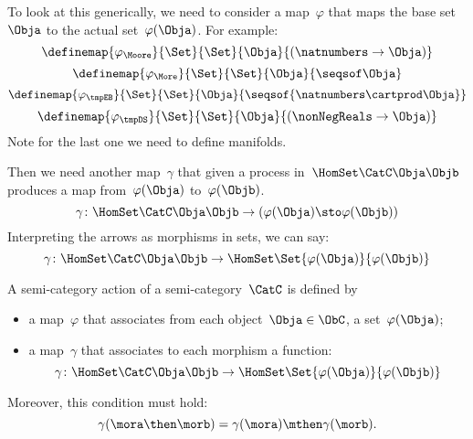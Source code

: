 To look at this generically, we need to consider a map~$\varphi$ that maps the base set~$\Obja$ to the actual set~$\varphi(\Obja)$. For example:
\begin{equation}
  \definemap{\varphi_{\Moore}}{\Set}{\Set}{\Obja}{(\natnumbers \to \Obja)}
\end{equation}
\begin{equation}
\definemap{\varphi_{\More}}{\Set}{\Set}{\Obja}{\seqsof \Obja}
\end{equation}
\begin{equation}
\definemap{\varphi_{\tmpEB}}{\Set}{\Set}{\Obja}{\seqsof{\natnumbers \cartprod \Obja}}
\end{equation}
\begin{equation}
\definemap{\varphi_{\tmpDS}}{\Set}{\Set}{\Obja}{(\nonNegReals \to \Obja)}
\end{equation}
Note for the last one we need to define manifolds.

Then we need another map~$\gamma$ that given a process in~$\HomSet\CatC\Obja\Objb$
produces a map from~$\varphi(\Obja)$ to~$\varphi(\Objb)$.
% 
\begin{equation}
  \gamma\colon \HomSet\CatC\Obja\Objb \to  (\varphi(\Obja) \sto \varphi(\Objb))
\end{equation}
% 
Interpreting the arrows as morphisms in sets, we can say:
\begin{equation}
  \gamma\colon \HomSet\CatC\Obja\Objb \to  \HomSet\Set{\varphi(\Obja)}{\varphi(\Objb) }
\end{equation}

\begin{ctdefinition}
  A semi-category action of a semi-category~$\CatC$ is defined by
  \begin{itemize}
    \item a map~$\varphi$ that associates from each object~$\Obja \in \ObC$, a set~$\varphi(\Obja)$;
    \item a map~$\gamma$ that associates to each morphism a function:
    \begin{equation}
      \gamma\colon \HomSet\CatC\Obja\Objb \to  \HomSet\Set{\varphi(\Obja)}{\varphi(\Objb) }
    \end{equation}
  \end{itemize}
  Moreover, this condition must hold:
  \begin{equation}
    \gamma(\mora\then\morb) = \gamma(\mora) \mthen \gamma(\morb).
  \end{equation}
\end{ctdefinition}